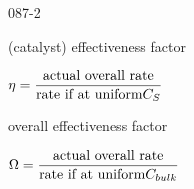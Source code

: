 \begin{mitframe}{087-2}


\begin{listone}
	\item (catalyst) effectiveness factor
	\item $\intrinsvisc=\dfrac{\text{actual overall rate}}{\text{rate if at uniform} \conc_{\entropy}}$
       
	\item overall effectiveness factor
	\item $\mpc=\dfrac{\text{actual overall rate}}{\text{rate if at uniform} \conc_{bulk}}$
        
\end{listone}
\end{mitframe}